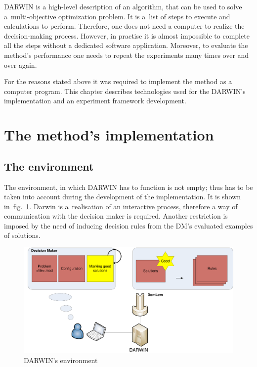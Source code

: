 DARWIN is a high-level description of an algorithm, that can be used to solve
a~multi-objective optimization problem. It is a~list of steps to execute and
calculations to perform. Therefore, one does not need a computer to realize
the decision-making process. However, in practise it is almost impossible to
complete all the steps without a dedicated software application. Moreover, to
evaluate the method's performance one needs to repeat the experiments many
times over and over again.

For the reasons stated above it was required to implement the method as a
computer program. This chapter describes technologies used for the DARWIN's
implementation and an experiment framework development.

\section{The method's implementation}

\subsection{The environment}

The environment, in which DARWIN has to function is not empty; thus has to be
taken into account during the development of the implementation. It is shown
in~fig.~\ref{environ}. Darwin is a~realisation of an interactive process,
therefore a way of communication with the decision maker is required. Another
restriction is imposed by the need of inducing decision rules from the DM's
evaluated examples of solutions.

\begin{figure}
  \centering \includegraphics[scale=0.5]{img/environ}
  \caption{DARWIN's environment}
  \label{environ}
\end{figure}

